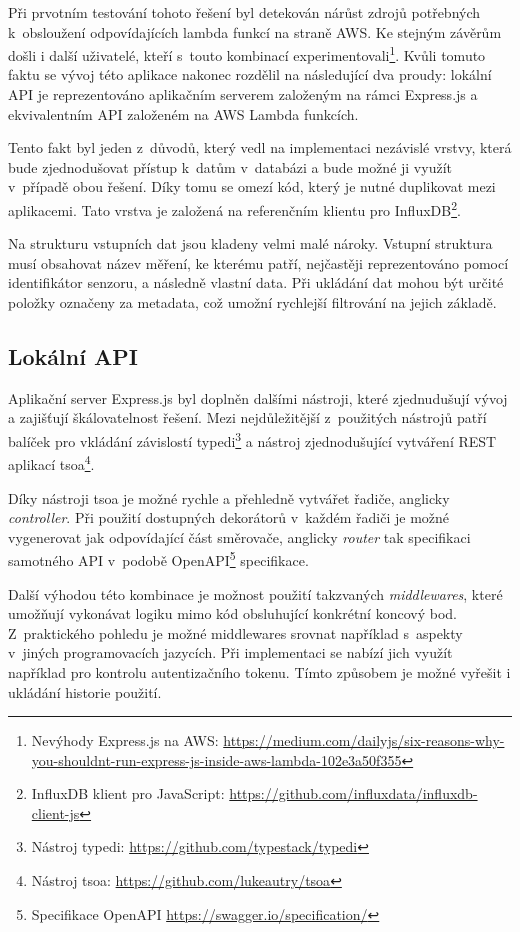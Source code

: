 Při prvotním testování tohoto řešení byl detekován nárůst zdrojů potřebných k~obsloužení odpovídajících lambda funkcí na straně AWS. Ke stejným závěrům došli i další uživatelé, kteří s~touto kombinací experimentovali\footnote{Nevýhody Express.js na AWS: \url{https://medium.com/dailyjs/six-reasons-why-you-shouldnt-run-express-js-inside-aws-lambda-102e3a50f355}}.  Kvůli tomuto faktu se vývoj této aplikace nakonec rozdělil na následující dva proudy: lokální API je reprezentováno aplikačním serverem založeným na rámci Express.js a ekvivalentním API založeném na AWS Lambda funkcích.

Tento fakt byl jeden z~důvodů, který vedl na implementaci nezávislé vrstvy, která bude zjednodušovat přístup k~datům v~databázi a bude možné ji využít v~případě obou řešení. Díky tomu se omezí kód, který je nutné duplikovat mezi aplikacemi. Tato vrstva je založená na referenčním klientu pro InfluxDB\footnote{InfluxDB klient pro JavaScript: \url{https://github.com/influxdata/influxdb-client-js}}.

Na strukturu vstupních dat jsou kladeny velmi malé nároky. Vstupní struktura musí obsahovat název měření, ke kterému patří, nejčastěji reprezentováno pomocí identifikátor senzoru, a následně vlastní data. Při ukládání dat mohou být určité položky označeny za metadata, což umožní rychlejší filtrování na jejich základě.

\subsection{Lokální API}
Aplikační server Express.js byl doplněn dalšími nástroji, které zjednudušují vývoj a zajišťují škálovatelnost řešení. Mezi nejdůležitější z~použitých nástrojů patří balíček pro vkládání závislostí typedi\footnote{Nástroj typedi: \url{https://github.com/typestack/typedi}} a nástroj zjednodušující vytváření REST aplikací tsoa\footnote{Nástroj tsoa: \url{https://github.com/lukeautry/tsoa}}.

Díky nástroji tsoa je možné rychle a přehledně vytvářet řadiče, anglicky \textit{controller}. Při použití dostupných dekorátorů v~každém řadiči je možné vygenerovat jak odpovídající část směrovače, anglicky \textit{router} tak specifikaci samotného API v~podobě OpenAPI\footnote{Specifikace OpenAPI \url{https://swagger.io/specification/}} specifikace. 

Další výhodou této kombinace je možnost použití takzvaných \textit{middlewares}, které umožňují vykonávat logiku mimo kód obsluhující konkrétní koncový bod. Z~praktického pohledu je možné middlewares srovnat například s~aspekty v~jiných programovacích jazycích. Při implementaci se nabízí jich využít například pro kontrolu autentizačního tokenu. Tímto způsobem je možné vyřešit i ukládání historie použití.

